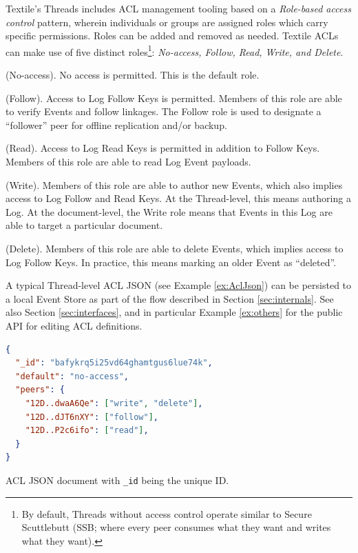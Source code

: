 \documentclass{textile}
\begin{document}
Textile's Threads includes ACL management tooling based on a \emph{Role-based access control} \cite{sandhuRolebasedAccessControl1996} pattern, wherein individuals or groups are assigned roles which carry specific permissions. Roles can be added and removed as needed. Textile ACLs can make use of five distinct roles\footnote{By default, Threads without access control operate similar to Secure Scuttlebutt (SSB; where every peer consumes what they want and writes what they want).}: \emph{No-access, Follow, Read, Write, and Delete}.

\begin{definition}
  (No-access). No access is permitted. This is the default role.
\end{definition}

\begin{definition}
  (Follow). Access to Log Follow Keys is permitted. Members of this role are able to verify Events and follow linkages. The Follow role is used to designate a ``follower'' peer for offline replication and/or backup.
\end{definition}

\begin{definition}
  (Read). Access to Log Read Keys is permitted in addition to Follow Keys. Members of this role are able to read Log Event payloads.
\end{definition}

\begin{definition}
  (Write). Members of this role are able to author new Events, which also implies access to Log Follow and Read Keys. At the Thread-level, this means authoring a Log. At the document-level, the Write role means that Events in this Log are able to target a particular document.
\end{definition}

\begin{definition}
  (Delete). Members of this role are able to delete Events, which implies access to Log Follow Keys. In practice, this means marking an older Event as ``deleted''.
\end{definition}

A typical Thread-level ACL JSON (see Example \ref{ex:AclJson}) can be persisted to a local Event Store as part of the flow described in Section \ref{sec:internals}. See also Section \ref{sec:interfaces}, and in particular Example \ref{ex:others} for the public API for editing ACL definitions.

\begin{example}
  \begin{minipage}{.45\textwidth}
    \begin{lstlisting}[language=json,firstnumber=1]
{
  "_id": "bafykrq5i25vd64ghamtgus6lue74k",
  "default": "no-access",
  "peers": {
    "12D..dwaA6Qe": ["write", "delete"],
    "12D..dJT6nXY": ["follow"],
    "12D..P2c6ifo": ["read"],
  }
}
    \end{lstlisting}
  \caption{ACL JSON document with \texttt{\_id} being the unique ID. }
  \label{ex:AclJson}
  \end{minipage}
\end{example}
\end{document}
